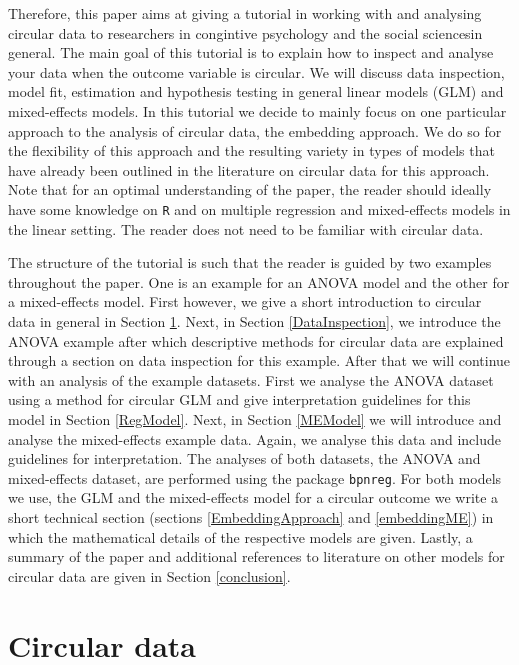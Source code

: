 \documentclass[11pt,]{article}
\begin{document}
Therefore, this paper aims at giving a tutorial in working with and
analysing circular data to researchers in congintive psychology and the
social sciencesin general. The main goal of this tutorial is to explain
how to inspect and analyse your data when the outcome variable is
circular. We will discuss data inspection, model fit, estimation and
hypothesis testing in general linear models (GLM) and mixed-effects
models. In this tutorial we decide to mainly focus on one particular
approach to the analysis of circular data, the embedding approach. We do
so for the flexibility of this approach and the resulting variety in
types of models that have already been outlined in the literature on
circular data for this approach. Note that for an optimal understanding
of the paper, the reader should ideally have some knowledge on \verb|R|
and on multiple regression and mixed-effects models in the linear
setting. The reader does not need to be familiar with circular data.

The structure of the tutorial is such that the reader is guided by two
examples throughout the paper. One is an example for an ANOVA model and
the other for a mixed-effects model. First however, we give a short
introduction to circular data in general in Section \ref{circdat}. Next,
in Section \ref{DataInspection}, we introduce the ANOVA example after
which descriptive methods for circular data are explained through a
section on data inspection for this example. After that we will continue
with an analysis of the example datasets. First we analyse the ANOVA
dataset using a method for circular GLM and give interpretation
guidelines for this model in Section \ref{RegModel}. Next, in Section
\ref{MEModel} we will introduce and analyse the mixed-effects example
data. Again, we analyse this data and include guidelines for
interpretation. The analyses of both datasets, the ANOVA and
mixed-effects dataset, are performed using the package \verb|bpnreg|.
For both models we use, the GLM and the mixed-effects model for a
circular outcome we write a short technical section (sections
\ref{EmbeddingApproach} and \ref{embeddingME}) in which the mathematical
details of the respective models are given. Lastly, a summary of the
paper and additional references to literature on other models for
circular data are given in Section \ref{conclusion}.

\section{Circular data}\label{circdat}
\end{document}
